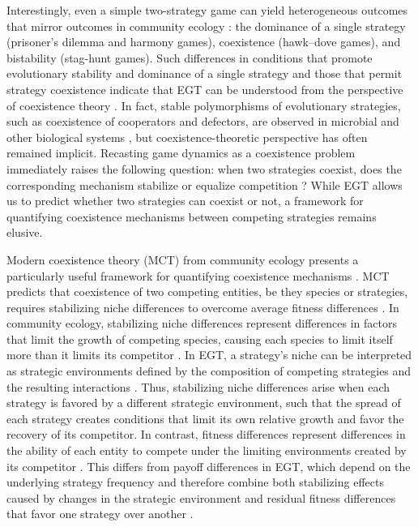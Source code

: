 \documentclass[12pt]{article}
\begin{document}
Interestingly, even a simple two-strategy game can yield heterogeneous outcomes that mirror outcomes in community ecology \citep{hauert2002effects,szabo2007evolutionary,cooney2020analysis,tarnita2025reconciling}: the dominance of a single strategy (prisoner’s dilemma and harmony games), coexistence (hawk–dove games), and bistability (stag-hunt games).
Such differences in conditions that promote evolutionary stability and dominance of a single strategy and those that permit strategy coexistence indicate that EGT can be understood from the perspective of coexistence theory \citep{motro1991co,doebeli2004evolutionary,hauert2004spatial,doebeli2005models,gore2009snowdrift,souza2009evolution,archetti2011coexistence,steidinger2014coexistence,tarnita2025reconciling}.
In fact, stable polymorphisms of evolutionary strategies, such as coexistence of cooperators and defectors, are observed in microbial and other biological systems \citep{gore2009snowdrift,cordero2012public,kocher2018genetic,pollak2021public,lin2024interspecific}, but coexistence-theoretic perspective has often remained implicit.
Recasting game dynamics as a coexistence problem immediately raises the following question: when two strategies coexist, does the corresponding mechanism stabilize or equalize competition \citep{chesson2000mechanisms}?
While EGT allows us to predict whether two strategies can coexist or not, a framework for quantifying coexistence mechanisms between competing strategies remains elusive.

Modern coexistence theory (MCT) from community ecology presents a particularly useful framework for quantifying coexistence mechanisms \citep{chesson2000mechanisms,adler2007niche,godoy2014phylogenetic,godoy2014phenology,kraft2015plant,adler2026have}. 
MCT predicts that coexistence of two competing entities, be they species or strategies, requires stabilizing niche differences to overcome average fitness differences \citep{chesson2000mechanisms,adler2007niche,kraft2015plant}.
In community ecology, stabilizing niche differences represent differences in factors that limit the growth of competing species, causing each species to limit itself more than it limits its competitor \citep{chesson2000mechanisms}.
In EGT, a strategy’s niche can be interpreted as strategic environments defined by the composition of competing strategies and the resulting interactions \citep{taylor1978evolutionary,cressman2014replicator,tarnita2025reconciling}.
Thus, stabilizing niche differences arise when each strategy is favored by a different strategic environment, such that the spread of each strategy creates conditions that limit its own relative growth and favor the recovery of its competitor.
In contrast, fitness differences represent differences in the ability of each entity to compete under the limiting environments created by its competitor \citep{chesson2000mechanisms}.
This differs from payoff differences in EGT, which depend on the underlying strategy frequency and therefore combine both stabilizing effects caused by changes in the strategic environment and residual fitness differences that favor one strategy over another \citep{taylor1978evolutionary,cressman2014replicator,tarnita2025reconciling}.
\end{document}

